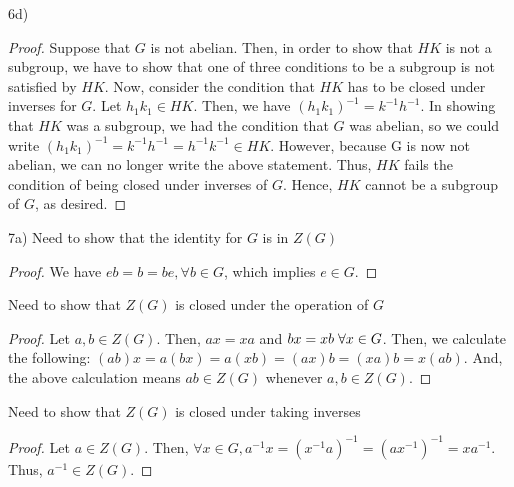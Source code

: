 \documentclass[executivepaper]{article}
\begin{document}
\begin{flushleft}

6d) 

\begin{proof}

Suppose that $G$ is not abelian. Then, in order to show that $HK$ is not a subgroup, we have to show that one of three conditions to be a subgroup is not satisfied by $HK$. Now, consider the condition that $HK$ has to be closed under inverses for $G$. Let $h_{1}k_{1} \in HK$. Then, we have $(h_{1}k_{1})^{-1}=k^{-1}h^{-1}$. In showing that $HK$ was a subgroup, we had the condition that $G$ was abelian, so we could write $(h_{1}k_{1})^{-1}=k^{-1}h^{-1}=h^{-1}k^{-1} \in HK$. However, because G is now not abelian, we can no longer write the above statement. Thus, $HK$ fails the condition of being closed under inverses of $G$. Hence, $HK$ cannot be a subgroup of $G$, as desired.

\end{proof}

\end{flushleft}

\begin{flushleft}

7a) Need to show that the identity for $G$ is in $Z(G)$

\begin{center}

\begin{proof}

We have $eb=b=be, \forall b \in G$, which implies $e \in G$.

\end{proof}

\end{center}

Need to show that $Z(G)$ is closed under the operation of $G$

\begin{center}

\begin{proof}

Let $a,b \in Z(G)$. Then, $ax=xa$ and $bx=xb \hspace{1mm} \forall x \in G$. Then, we calculate the following: $(ab)x=a(bx)=a(xb)=(ax)b=(xa)b=x(ab)$. And, the above calculation means $ab \in Z(G)$ whenever $a,b \in Z(G)$.

\end{proof}

\end{center}

Need to show that $Z(G)$ is closed under taking inverses

\begin{center}

\begin{proof}

Let $a \in Z(G)$. Then, $\forall x \in G, a^{-1}x=(x^{-1}a)^{-1}=(ax^{-1})^{-1}=xa^{-1}$. Thus, $a^{-1} \in Z(G)$.

\end{proof}

\end{center}

\end{flushleft}
\end{document}
